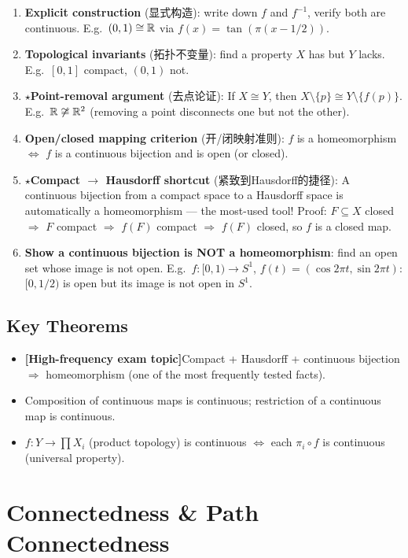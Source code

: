 \documentclass{article}
\newcommand{\starKey}{\textcolor{red!65!black}{\textbf{$\star$}}}
\newcommand{\examKey}{\textcolor{red!65!black}{\textbf{[High-frequency exam topic]}}}
\begin{document}
\begin{enumerate}
  \item \textbf{Explicit construction} (显式构造): write down $f$ and $f^{-1}$,
  verify both are continuous. E.g.\ $(0,1)\cong\mathbb{R}$ via $f(x)=\tan(\pi(x-1/2))$.
  \item \textbf{Topological invariants} (拓扑不变量): find a property $X$ has
  but $Y$ lacks. E.g.\ $[0,1]$ compact, $(0,1)$ not.
  \item \starKey \textbf{Point-removal argument} (去点论证):
  If $X\cong Y$, then $X\setminus\{p\}\cong Y\setminus\{f(p)\}$.
  E.g.\ $\mathbb{R}\not\cong\mathbb{R}^2$ (removing a point disconnects one but not the other).
  \item \textbf{Open/closed mapping criterion} (开/闭映射准则):
  $f$ is a homeomorphism $\iff$ $f$ is a continuous bijection and is open (or closed).
  \item \starKey \textbf{Compact $\to$ Hausdorff shortcut} (紧致到Hausdorff的捷径):
  A continuous bijection from a compact space to a Hausdorff space is automatically
  a homeomorphism --- the most-used tool!
  Proof: $F\subseteq X$ closed $\Rightarrow$ $F$ compact $\Rightarrow$
  $f(F)$ compact $\Rightarrow$ $f(F)$ closed, so $f$ is a closed map.
  \item \textbf{Show a continuous bijection is NOT a homeomorphism}: find an open set
  whose image is not open. E.g.\ $f:[0,1)\to S^1$, $f(t)=(\cos2\pi t,\sin2\pi t)$:
  $[0,1/2)$ is open but its image is not open in $S^1$.
\end{enumerate}

\subsection{Key Theorems}

\begin{itemize}
  \item \examKey Compact + Hausdorff + continuous bijection $\Rightarrow$ homeomorphism
  (one of the most frequently tested facts).
  \item Composition of continuous maps is continuous; restriction of a continuous map
  is continuous.
  \item $f:Y\to\prod X_i$ (product topology) is continuous $\iff$
  each $\pi_i\circ f$ is continuous (universal property).
\end{itemize}

\section{Connectedness \& Path Connectedness}
\end{document}
